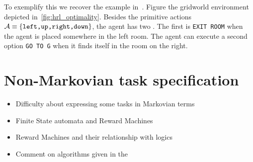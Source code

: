 To exemplify this we recover the example in~\citep{Dietterich2000}. Figure the gridworld environment depicted in~\ref{fig:hrl_optimality}. Besides the primitive actions $\mathcal{A}\equiv\{\text{\texttt{left,up,right,down}}\}$, the agent has two . The first is \texttt{EXIT ROOM} when the agent is placed somewhere in the left room. The agent can execute a second option \texttt{GO TO G} when it finds itself in the room on the right. 



\section{Non-Markovian task specification}
\label{section:non_markovian}
 {\color{blue}
 
 \begin{itemize}
 \item Difficulty about expressing some tasks in Markovian terms 
 \item Finite State automata and Reward Machines 
 \item Reward Machines and their relationship with logics
 \item Comment on algorithms given in the 
  
\end{itemize}
 
 }


